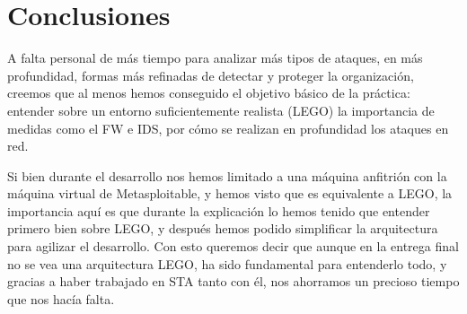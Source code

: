 \documentclass[a4paper,12pt]{scrartcl}
\begin{document}
\section{Conclusiones}

A falta personal de más tiempo para analizar más tipos de ataques, en más profundidad, formas más refinadas de detectar y proteger la organización, creemos que al menos hemos conseguido el objetivo básico de la práctica: entender sobre un entorno suficientemente realista (LEGO) la importancia de medidas como el FW e IDS, por cómo se realizan en profundidad los ataques en red.

Si bien durante el desarrollo nos hemos limitado a una máquina anfitrión con la máquina virtual de Metasploitable, y hemos visto que es equivalente a LEGO, la importancia aquí es que durante la explicación lo hemos tenido que entender primero bien sobre LEGO, y después hemos podido simplificar la arquitectura para agilizar el desarrollo. Con esto queremos decir que aunque en la entrega final no se vea una arquitectura LEGO, ha sido fundamental para entenderlo todo, y gracias a haber trabajado en STA tanto con él, nos ahorramos un precioso tiempo que nos hacía falta.





\end{document}
